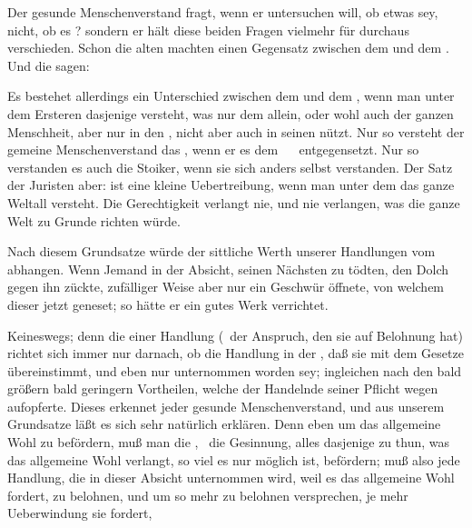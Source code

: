  Der gesunde Menschenverstand fragt, wenn er untersuchen will, ob etwas  sey, nicht, ob es ? sondern er hält diese beiden Fragen vielmehr für durchaus verschieden. Schon die alten  machten einen Gegensatz zwischen dem  und dem . Und die  sagen: \par
{} Es bestehet allerdings ein Unterschied zwischen dem  und dem , wenn man unter dem Ersteren dasjenige versteht, was nur dem  allein, oder wohl auch der ganzen Menschheit, aber nur in den , nicht aber auch in seinen  nützt. Nur so versteht der gemeine Menschenverstand das , wenn er es dem ~\  entgegensetzt. Nur so verstanden es auch die Stoiker, wenn sie sich anders selbst verstanden. Der Satz der Juristen aber:  ist eine kleine Uebertreibung, wenn man unter dem  das ganze Weltall versteht. Die  Gerechtigkeit verlangt nie, und  nie verlangen, was die ganze Welt zu Grunde richten würde.\par
{} Nach diesem Grundsatze würde der sittliche Werth unserer Handlungen vom  abhangen. Wenn Jemand in der Absicht, seinen Nächsten zu tödten, den Dolch gegen ihn zückte, zufälliger Weise aber nur ein Geschwür öffnete, von welchem dieser jetzt geneset; so hätte er ein gutes Werk verrichtet.\par
{} Keineswegs; denn die  einer Handlung (\dh\ der Anspruch, den sie auf Belohnung hat) richtet sich immer nur darnach, ob die Handlung in der , daß sie mit dem Gesetze übereinstimmt, und eben nur  unternommen worden sey; ingleichen nach den bald größern bald geringern Vortheilen, welche der Handelnde seiner Pflicht wegen aufopferte. Dieses erkennet jeder gesunde Menschenverstand, und aus unserem Grundsatze läßt es sich sehr natürlich erklären. Denn eben um das allgemeine Wohl zu befördern, muß man die , \dh\ die Gesinnung, alles dasjenige zu thun, was das allgemeine Wohl verlangt, so viel es nur möglich ist, befördern; muß also jede Handlung, die in dieser Absicht unternommen wird, weil es das allgemeine Wohl fordert, zu belohnen, und um so mehr zu belohnen versprechen, je mehr Ueberwindung sie fordert, \usw\par
